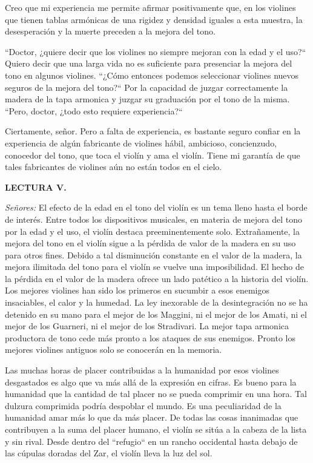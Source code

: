 \documentclass[12pt]{book}
\begin{document}
Creo que mi experiencia me permite afirmar positivamente que, en los violines que tienen tablas armónicas de una rigidez y densidad iguales a esta muestra, la desesperación y la muerte preceden a la mejora del tono.

``Doctor, ¿quiere decir que los violines no siempre mejoran con la edad y el uso?``
Quiero decir que una larga vida no es suficiente para presenciar la mejora del tono en algunos violines.
``¿Cómo entonces podemos seleccionar violines nuevos seguros de la mejora del tono?``
Por la capacidad de juzgar correctamente la madera de la tapa armonica y juzgar su graduación por el tono de la misma.
``Pero, doctor, ¿todo esto requiere experiencia?``

Ciertamente, señor. Pero a falta de experiencia, es bastante seguro confiar en la experiencia de algún fabricante de violines hábil, ambicioso, concienzudo, conocedor del tono, que toca el violín y ama el violín. Tiene mi garantía de que tales fabricantes de violines aún no están todos en el cielo.

\textbf{LECTURA V.}

\textit{Señores:} El efecto de la edad en el tono del violín es un tema lleno hasta el borde de interés. Entre todos los dispositivos musicales, en materia de mejora del tono por la edad y el uso, el violín destaca preeminentemente solo. Extrañamente, la mejora del tono en el violín sigue a la pérdida de valor de la madera en su uso para otros fines. Debido a tal disminución constante en el valor de la madera, la mejora ilimitada del tono para el violín se vuelve una imposibilidad. El hecho de la pérdida en el valor de la madera ofrece un lado patético a la historia del violín. Los mejores violines han sido los primeros en sucumbir a esos enemigos insaciables, el calor y la humedad. La ley inexorable de la desintegración no se ha detenido en su mano para el mejor de los Maggini, ni el mejor de los Amati, ni el mejor de los Guarneri, ni el mejor de los Stradivari. La mejor tapa armonica productora de tono cede más pronto a los ataques de sus enemigos. Pronto los mejores violines antiguos solo se conocerán en la memoria.

Las muchas horas de placer contribuidas a la humanidad por esos violines desgastados es algo que va más allá de la expresión en cifras. Es bueno para la humanidad que la cantidad de tal placer no se pueda comprimir en una hora. Tal dulzura comprimida podría despoblar el mundo. Es una peculiaridad de la humanidad amar más lo que da más placer. De todas las cosas inanimadas que contribuyen a la suma del placer humano, el violín se sitúa a la cabeza de la lista y sin rival. Desde dentro del ``refugio`` en un rancho occidental hasta debajo de las cúpulas doradas del Zar, el violín lleva la luz del sol.
\end{document}
